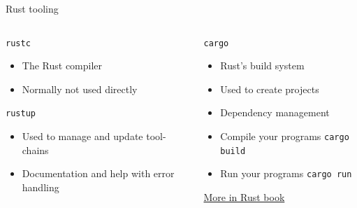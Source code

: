 \documentclass[aspectratio=169]{beamer}
\begin{document}
\begin{frame}[c]{Rust tooling}{}

  \begin{columns}
    \begin{column}{.5\linewidth}
      \texttt{rustc}

      \begin{itemize}
      \item The Rust compiler
      \item Normally not used directly
      \end{itemize}

      \vspace{.5cm}

      \texttt{rustup}

      \begin{itemize}
      \item Used to manage and update tool-chains
      \item Documentation and help with error handling
      \end{itemize}
    \end{column}

    \begin{column}{.5\linewidth}
      \texttt{cargo}

      \begin{itemize}
      \item Rust's build system
      \item Used to create projects
      \item Dependency management

      \item Compile your programs \texttt{cargo build}
      \item Run your programs \texttt{cargo run}
      \end{itemize}

      \qquad \qquad \href{https://doc.rust-lang.org/book/ch01-03-hello-cargo.html}{More in Rust book}
    \end{column}
  \end{columns}
\end{frame}
\end{document}
